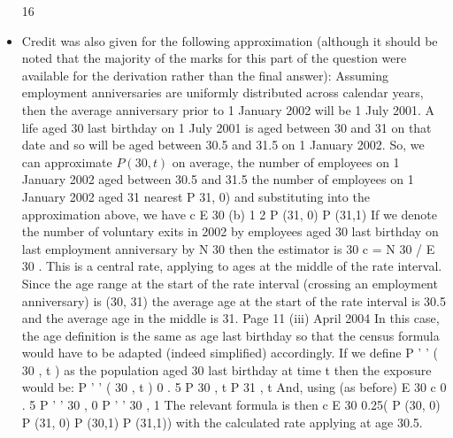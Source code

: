 \documentclass[a4paper,12pt]{article}
\begin{document}
\begin{itemize}
16
\item Credit was also given for the following approximation (although it
should be noted that the majority of the marks for this part of the
question were available for the derivation rather than the final
answer):
Assuming employment anniversaries are uniformly distributed across
calendar years, then the average anniversary prior to 1 January 2002
will be 1 July 2001. A life aged 30 last birthday on 1 July 2001 is aged
between 30 and 31 on that date and so will be aged between 30.5 and
31.5 on 1 January 2002. So, we can approximate
$P (30, t )$
on average, the number of employees on 1 January 2002
aged between 30.5 and 31.5
the number of employees on 1 January 2002 aged 31
nearest
P 31, 0)
and substituting into the approximation above, we have
c
E 30
(b)
1
2
P (31, 0) P (31,1)
If we denote the number of voluntary exits in 2002 by employees aged
30 last birthday on last employment anniversary by N 30 then the
estimator is
30
c
= N 30 / E 30
.
This is a central rate, applying to ages at the middle of the rate interval.
Since the age range at the start of the rate interval (crossing an
employment anniversary) is (30, 31) the average age at the start of the
rate interval is 30.5 and the average age in the middle is 31.
Page 11 %
(iii)
April 2004
In this case, the age definition is the same as age last birthday so that the
census formula would have to be adapted (indeed simplified) accordingly.
If we define P ' ' ( 30 , t ) as the population aged 30 last birthday at time t then the
exposure would be:
P ' ' ( 30 , t ) 0 . 5 P 30 , t P 31 , t
And, using (as before)
E 30 c 0 . 5 P ' ' 30 , 0 P ' ' 30 , 1
The relevant formula is then
c
E 30
0.25( P (30, 0) P (31, 0) P (30,1) P (31,1))
with the calculated rate applying at age 30.5.
\end{itemize}
\end{document}

